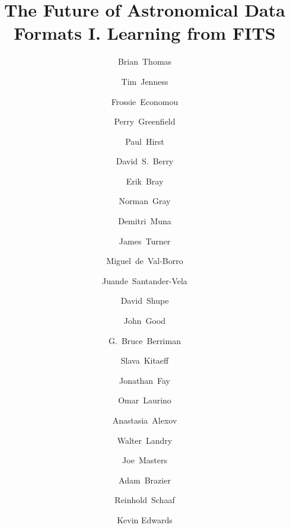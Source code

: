 \documentclass[final,authoryear,5p,times,twocolumn]{elsarticle}
\begin{document}
\begin{frontmatter}



\title{The Future of Astronomical Data Formats I. Learning from FITS}


\author[noao]{Brian~Thomas}
\author[cornell]{Tim~Jenness}
\author[noao]{Frossie~Economou}
\author[stsci]{Perry~Greenfield}
\author[geminin]{Paul~Hirst}
\author[jac]{David~S.~Berry}
\author[stsci]{Erik~Bray}
\author[glasgow]{Norman~Gray}
\author[ohio]{Demitri~Muna}
\author[geminis]{James~Turner}
\author[princeton]{Miguel~de~Val-Borro}
\author[iaa]{Juande~Santander-Vela}
\author[ipac]{David~Shupe}
\author[ipac]{John~Good}
\author[ipac]{G.~Bruce~Berriman}
\author[icrar]{Slava~Kitaeff}
\author[microsoft]{Jonathan~Fay}
\author[sao]{Omar~Laurino}
\author[stsci]{Anastasia~Alexov}
\author[ipac]{Walter~Landry}
\author[nrao]{Joe~Masters}
\author[cornell]{Adam~Brazier}
\author[aifa]{Reinhold~Schaaf}
\author[uwaterloo]{Kevin Edwards}



\end{frontmatter}
\end{document}
